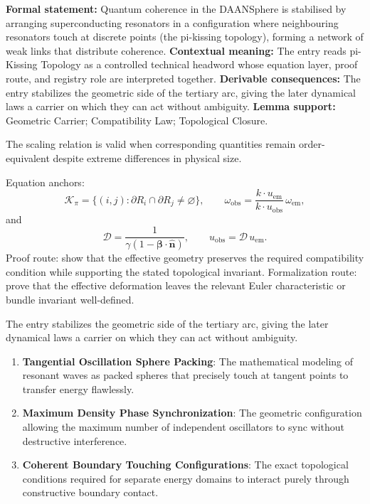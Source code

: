 \begingroup\footnotesize\setlength{\emergencystretch}{3em}\sloppy
\textbf{Formal statement:} Quantum coherence in the DAANSphere is stabilised by arranging superconducting resonators in a configuration where neighbouring resonators touch at discrete points (the pi-kissing topology), forming a network of weak links that distribute coherence. \textbf{Contextual meaning:} The entry reads pi-Kissing Topology as a controlled technical headword whose equation layer, proof route, and registry role are interpreted together. \textbf{Derivable consequences:} The entry stabilizes the geometric side of the tertiary arc, giving the later dynamical laws a carrier on which they can act without ambiguity. \textbf{Lemma support:} Geometric Carrier; Compatibility Law; Topological Closure.\par
\endgroup

The scaling relation is valid when corresponding quantities remain order-equivalent despite extreme differences in physical size.

Equation anchors:
\[
\mathcal{K}_{\pi}=\{(i,j):\partial R_i\cap\partial R_j\neq\varnothing\},
\qquad
\omega_{\mathrm{obs}}=\frac{k\cdot u_{\mathrm{em}}}{k\cdot u_{\mathrm{obs}}}\,\omega_{\mathrm{em}},
\]
and
\[
\mathcal{D}=\frac{1}{\gamma(1-\boldsymbol{\beta}\cdot\hat{\mathbf n})},
\qquad
u_{\mathrm{obs}}=\mathcal{D}\,u_{\mathrm{em}}.
\]
Proof route: show that the effective geometry preserves the required compatibility condition while supporting the stated topological invariant. Formalization route: prove that the effective deformation leaves the relevant Euler characteristic or bundle invariant well-defined.

The entry stabilizes the geometric side of the tertiary arc, giving the later dynamical laws a carrier on which they can act without ambiguity.
\endgroup

\begin{enumerate}[leftmargin=1.6em,itemsep=6pt,topsep=4pt]
\item \textbf{Tangential Oscillation Sphere Packing}: The mathematical modeling of resonant waves as packed spheres that precisely touch at tangent points to transfer energy flawlessly.
\item \textbf{Maximum Density Phase Synchronization}: The geometric configuration allowing the maximum number of independent oscillators to sync without destructive interference.
\item \textbf{Coherent Boundary Touching Configurations}: The exact topological conditions required for separate energy domains to interact purely through constructive boundary contact.
\end{enumerate}

